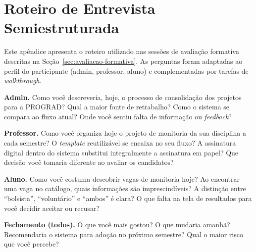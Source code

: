 \documentclass[portuguese]{sbc2025}%
\begin{document}
\section{Roteiro de Entrevista Semiestruturada}
\label{sec:appendix-roteiro}

Este apêndice apresenta o roteiro utilizado nas sessões de avaliação formativa descritas na Seção~\ref{sec:avaliacao-formativa}. As perguntas foram adaptadas ao perfil do participante (admin, professor, aluno) e complementadas por tarefas de \textit{walkthrough}.

\textbf{Admin.} Como você descreveria, hoje, o processo de consolidação dos projetos para a PROGRAD? Qual a maior fonte de retrabalho? Como o sistema se compara ao fluxo atual? Onde você sentiu falta de informação ou \textit{feedback}?

\textbf{Professor.} Como você organiza hoje o projeto de monitoria da sua disciplina a cada semestre? O \textit{template} reutilizável se encaixa no seu fluxo? A assinatura digital dentro do sistema substitui integralmente a assinatura em papel? Que decisão você tomaria diferente ao avaliar os candidatos?

\textbf{Aluno.} Como você costuma descobrir vagas de monitoria hoje? Ao encontrar uma vaga no catálogo, quais informações são imprescindíveis? A distinção entre ``bolsista'', ``voluntário'' e ``ambos'' é clara? O que falta na tela de resultados para você decidir aceitar ou recusar?

\textbf{Fechamento (todos).} O que você mais gostou? O que mudaria amanhã? Recomendaria o sistema para adoção no próximo semestre? Qual o maior risco que você percebe?

\twocolumn
\end{document}
